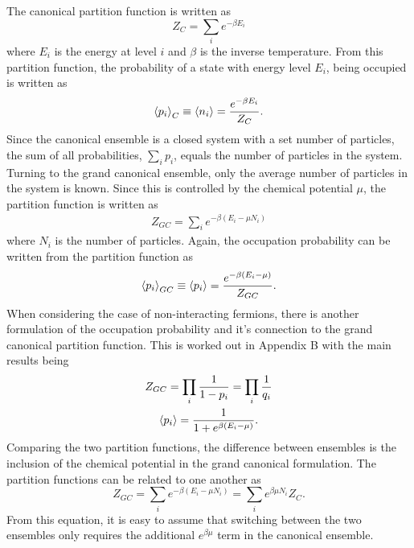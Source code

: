 The canonical partition function is written as 
\begin{equation}
    Z_C=\sum_i e^{-\beta E_i}
\end{equation}
where $E_i$ is the energy at level $i$ and $\beta$ is the inverse temperature. From this partition function, the probability of a state with energy level $E_i$, being occupied is written as  
\begin{equation}
    \left<{p_i}\right>_C\equiv \left<{n_i}\right>=\frac{e^{-\beta E_i}}{Z_C}.
\end{equation}
Since the canonical ensemble is a closed system with a set number of particles, the sum of all probabilities, $\sum_i p_i$, equals the number of particles in the system. Turning to the grand canonical ensemble, only the average number of particles in the system is known. Since this is controlled by the chemical potential $\mu$, the partition function is written as
\begin{gather}
    Z_{GC}=\sum_i e^{-\beta(E_i-\mu N_i)}
\end{gather}
where $N_i$ is the number of particles. Again, the occupation probability can be written from the partition function as 
\begin{equation}
    \left<{p_i}\right>_{GC}\equiv\left<{p_i}\right>=\frac{e^{-\beta(E_i-\mu)}}{Z_{GC}}.
\end{equation}
When considering the case of non-interacting fermions, there is another formulation of the occupation probability and it's connection to the grand canonical partition function. This is worked out in Appendix B with the main results being 
\begin{gather}
    Z_{GC}=\prod_i \frac{1}{1-p_i}=\prod_i \frac{1}{q_i}\\
    \left<{p_i}\right>=\frac{1}{1+e^{\beta(E_i-\mu)}}.
\end{gather}
Comparing the two partition functions, the difference between ensembles is the inclusion of the chemical potential in the grand canonical formulation. The partition functions can be related to one another as
\begin{equation}
    Z_{GC}=\sum_i e^{-\beta(E_i-\mu N_i)}=\sum_i e^{\beta \mu N_i} Z_{C}.
\end{equation}
From this equation, it is easy to assume that switching between the two ensembles only requires the additional $e^{\beta\mu}$ term in the canonical ensemble. 

